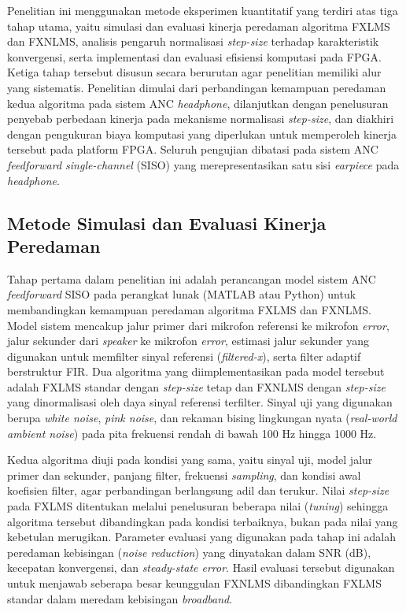 Penelitian ini menggunakan metode eksperimen kuantitatif yang terdiri atas tiga tahap utama, yaitu simulasi dan evaluasi kinerja peredaman algoritma FXLMS dan FXNLMS, analisis pengaruh normalisasi \emph{step-size} terhadap karakteristik konvergensi, serta implementasi dan evaluasi efisiensi komputasi pada FPGA. Ketiga tahap tersebut disusun secara berurutan agar penelitian memiliki alur yang sistematis. Penelitian dimulai dari perbandingan kemampuan peredaman kedua algoritma pada sistem ANC \emph{headphone}, dilanjutkan dengan penelusuran penyebab perbedaan kinerja pada mekanisme normalisasi \emph{step-size}, dan diakhiri dengan pengukuran biaya komputasi yang diperlukan untuk memperoleh kinerja tersebut pada platform FPGA. Seluruh pengujian dibatasi pada sistem ANC \emph{feedforward single-channel} (SISO) yang merepresentasikan satu sisi \emph{earpiece} pada \emph{headphone}.

\subsection{Metode Simulasi dan Evaluasi Kinerja Peredaman}
\label{sec:metode_simulasi}

Tahap pertama dalam penelitian ini adalah perancangan model sistem ANC \emph{feedforward} SISO pada perangkat lunak (MATLAB atau Python) untuk membandingkan kemampuan peredaman algoritma FXLMS dan FXNLMS. Model sistem mencakup jalur primer dari mikrofon referensi ke mikrofon \emph{error}, jalur sekunder dari \emph{speaker} ke mikrofon \emph{error}, estimasi jalur sekunder yang digunakan untuk memfilter sinyal referensi (\emph{filtered-x}), serta filter adaptif berstruktur FIR. Dua algoritma yang diimplementasikan pada model tersebut adalah FXLMS standar dengan \emph{step-size} tetap dan FXNLMS dengan \emph{step-size} yang dinormalisasi oleh daya sinyal referensi terfilter. Sinyal uji yang digunakan berupa \emph{white noise}, \emph{pink noise}, dan rekaman bising lingkungan nyata (\emph{real-world ambient noise}) pada pita frekuensi rendah di bawah 100 Hz hingga 1000 Hz.

Kedua algoritma diuji pada kondisi yang sama, yaitu sinyal uji, model jalur primer dan sekunder, panjang filter, frekuensi \emph{sampling}, dan kondisi awal koefisien filter, agar perbandingan berlangsung adil dan terukur. Nilai \emph{step-size} pada FXLMS ditentukan melalui penelusuran beberapa nilai (\emph{tuning}) sehingga algoritma tersebut dibandingkan pada kondisi terbaiknya, bukan pada nilai yang kebetulan merugikan. Parameter evaluasi yang digunakan pada tahap ini adalah peredaman kebisingan (\emph{noise reduction}) yang dinyatakan dalam SNR (dB), kecepatan konvergensi, dan \emph{steady-state error}. Hasil evaluasi tersebut digunakan untuk menjawab seberapa besar keunggulan FXNLMS dibandingkan FXLMS standar dalam meredam kebisingan \emph{broadband}.

